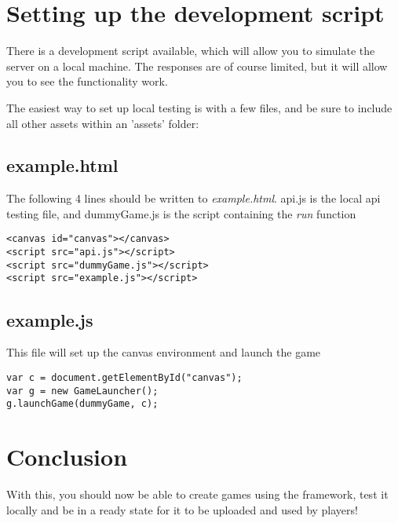 \documentclass[a4paper,12pt]{article}
\begin{document}
\section{Setting up the development script}

There is a development script available, which will allow you to simulate the server on a local machine. The responses are of course limited, but
it will allow you to see the functionality work.

The easiest way to set up local testing is with a few files, and be sure to include all other assets within an 'assets' folder:

\subsection*{example.html}
The following 4 lines should be written to \textit{example.html}. api.js is the local api testing file, and dummyGame.js is the script containing the \textit{run} function

\begin{verbatim}
<canvas id="canvas"></canvas>
<script src="api.js"></script>
<script src="dummyGame.js"></script>
<script src="example.js"></script>
\end{verbatim}

\subsection*{example.js}
This file will set up the canvas environment and launch the game

\begin{verbatim}
var c = document.getElementById("canvas");
var g = new GameLauncher();
g.launchGame(dummyGame, c);
\end{verbatim}

\section{Conclusion}
With this, you should now be able to create games using the framework, test it locally and be in a ready state for it to be uploaded and used by players!
\end{document}
